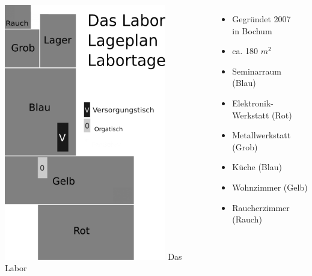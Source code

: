 \documentclass[aspectratio=1610]{beamer}
\begin{document}
  \begin{frame}
    \begin{columns}[l]
      \includegraphics[width=0.8\textwidth]{daslabor-map.png}
      Das Labor
      \begin{itemize}
        \item Gegründet 2007\\in Bochum
        \item ca. 180 $m^2$
        \item Seminarraum (Blau)
        \item Elektronik-Werkstatt (Rot)
        \item Metallwerkstatt (Grob)
        \item Küche (Blau)
        \item Wohnzimmer (Gelb)
        \item Raucherzimmer (Rauch)
      \end{itemize}
    \end{columns}
  \end{frame}
\end{document}
